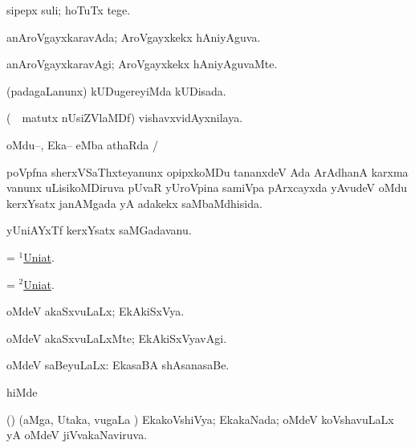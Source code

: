 \bentry
{} 
\gl{\akirx}
\expl{}
\bmng
sipepx suli; hoTuTx tege. 
\emng
\eentry

\bentry
{} 
\gl{\gu}
\expl{}
\bmng
anAroVgayxkaravAda; AroVgayxkekx hAniyAguva. 
\emng
\eentry

\bentry
{} 
\gl{\kirxvi}
\expl{}
\bmng
anAroVgayxkaravAgi; AroVgayxkekx hAniyAguvaMte. 
\emng
\eentry

\bentry
{} 
\gl{\gu}
\expl{}
\bmng
(padagaLanunx) kUDugereyiMda kUDisada. 
\emng
\eentry

\bentry
{} 
\gl{\nA}
\bmng
(\kanmu\ \AseTxrXV\ matutx nUsiZVlaMDf) vishavxvidAyxnilaya. 
\emng
\eentry

\bentry
{} 
\gl{\sapUpa}
\expl{}
\bmng
oMdu--, Eka-- eMba athaRda \sapUpa/ 
\emng
\eentry

\bentry
{} 
\gl{\gu}
\expl{}
\bmng
poVpfna sherxVSaThxteyanunx opipxkoMDu tananxdeV Ada ArAdhanA karxma \mo vanunx uLisikoMDiruva pUvaR yUroVpina samiVpa pArxcayxda yAvudeV oMdu kerxYsatx janAMgada yA adakekx saMbaMdhisida. 
\emng
\eentry

\bentry
{} 
\gl{\nA}
\expl{}
\bmng
yUniAYxTf kerxYsatx saMGadavanu. 
\emng
\eentry

\bentry
{} 
\gl{\gu}
\expl{}
\bmng
= \hyperlink{Uniat(1)}{$^1$Uniat}. 
\emng
\eentry

\bentry
{} 
\gl{\nA}
\expl{}
\bmng
= \hyperlink{Uniat(2)}{$^2$Uniat}. 
\emng
\eentry

\bentry
{} 
\gl{\gu}
\expl{}
\bmng
oMdeV akaSxvuLaLx; EkAkiSxVya. 
\emng
\eentry

\bentry
{} 
\gl{\kirxvi}
\expl{}
\bmng
oMdeV akaSxvuLaLxMte; EkAkiSxVyavAgi. 
\emng
\eentry

\bentry
{} 
\gl{\gu}
\expl{}
\bmng
oMdeV saBeyuLaLx:  EkasaBA shAsanasaBe. 
\emng
\eentry

\bentry
{} 
\gl{\saMkiSx}
\expl{}
\bmng
{}hiMde  
\emng
\eentry

\bentry
{} 
\gl{\gu}
\expl{}
\bmng
(\jiVvi) (aMga, Utaka, \mo vugaLa \vi) EkakoVshiVya; EkakaNada; oMdeV koVshavuLaLx yA oMdeV jiVvakaNaviruva. 
\emng
\eentry

